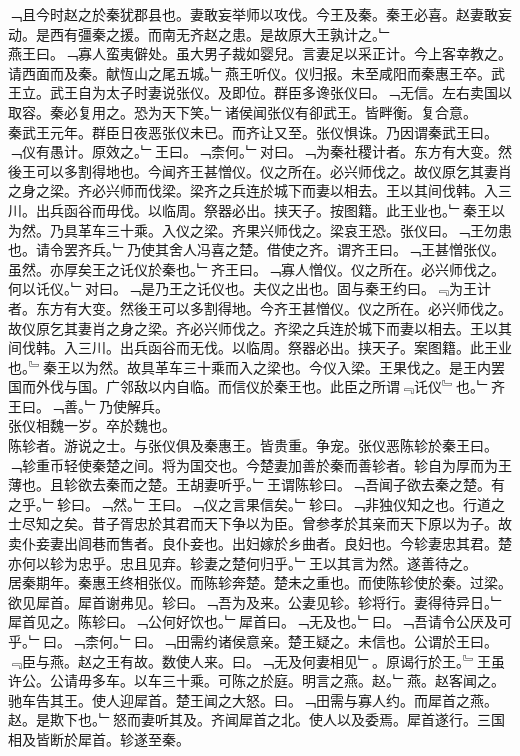 \documentclass{zhvt-classic}
\begin{document}
\hspace*{2em}﹁且今时赵之於秦犹郡县也。妻敢妄举师以攻伐。今王及秦。秦王必喜。赵妻敢妄动。是西有彊秦之援。而南无齐赵之患。是故原大王孰计之。﹂\\
\hspace*{2em}燕王曰。﹁寡人蛮夷僻处。虽大男子裁如婴兒。言妻足以采正计。今上客幸教之。请西面而及秦。献恆山之尾五城。﹂燕王听仪。仪归报。未至咸阳而秦惠王卒。武王立。武王自为太子时妻说张仪。及即位。群臣多谗张仪曰。﹁无信。左右卖国以取容。秦必复用之。恐为天下笑。﹂诸侯闻张仪有卻武王。皆畔衡。复合意。\\
\hspace*{2em}秦武王元年。群臣日夜恶张仪未已。而齐让又至。张仪惧诛。乃因谓秦武王曰。﹁仪有愚计。原效之。﹂王曰。﹁柰何。﹂对曰。﹁为秦社稷计者。东方有大变。然後王可以多割得地也。今闻齐王甚憎仪。仪之所在。必兴师伐之。故仪原乞其妻肖之身之梁。齐必兴师而伐梁。梁齐之兵连於城下而妻以相去。王以其间伐韩。入三川。出兵函谷而毋伐。以临周。祭器必出。挟天子。按图籍。此王业也。﹂秦王以为然。乃具革车三十乘。入仪之梁。齐果兴师伐之。梁哀王恐。张仪曰。﹁王勿患也。请令罢齐兵。﹂乃使其舍人冯喜之楚。借使之齐。谓齐王曰。﹁王甚憎张仪。虽然。亦厚矣王之讬仪於秦也。﹂齐王曰。﹁寡人憎仪。仪之所在。必兴师伐之。何以讬仪。﹂对曰。﹁是乃王之讬仪也。夫仪之出也。固与秦王约曰。﹃为王计者。东方有大变。然後王可以多割得地。今齐王甚憎仪。仪之所在。必兴师伐之。故仪原乞其妻肖之身之梁。齐必兴师伐之。齐梁之兵连於城下而妻以相去。王以其间伐韩。入三川。出兵函谷而无伐。以临周。祭器必出。挟天子。案图籍。此王业也。﹄秦王以为然。故具革车三十乘而入之梁也。今仪入梁。王果伐之。是王内罢国而外伐与国。广邻敌以内自临。而信仪於秦王也。此臣之所谓﹃讬仪﹄也。﹂齐王曰。﹁善。﹂乃使解兵。\\
\hspace*{2em}张仪相魏一岁。卒於魏也。\\
\hspace*{2em}陈轸者。游说之士。与张仪俱及秦惠王。皆贵重。争宠。张仪恶陈轸於秦王曰。﹁轸重币轻使秦楚之间。将为国交也。今楚妻加善於秦而善轸者。轸自为厚而为王薄也。且轸欲去秦而之楚。王胡妻听乎。﹂王谓陈轸曰。﹁吾闻子欲去秦之楚。有之乎。﹂轸曰。﹁然。﹂王曰。﹁仪之言果信矣。﹂轸曰。﹁非独仪知之也。行道之士尽知之矣。昔子胥忠於其君而天下争以为臣。曾参孝於其亲而天下原以为子。故卖仆妾妻出闾巷而售者。良仆妾也。出妇嫁於乡曲者。良妇也。今轸妻忠其君。楚亦何以轸为忠乎。忠且见弃。轸妻之楚何归乎。﹂王以其言为然。遂善待之。\\
\hspace*{2em}居秦期年。秦惠王终相张仪。而陈轸奔楚。楚未之重也。而使陈轸使於秦。过梁。欲见犀首。犀首谢弗见。轸曰。﹁吾为及来。公妻见轸。轸将行。妻得待异日。﹂犀首见之。陈轸曰。﹁公何好饮也。﹂犀首曰。﹁无及也。﹂曰。﹁吾请令公厌及可乎。﹂曰。﹁柰何。﹂曰。﹁田需约诸侯意亲。楚王疑之。未信也。公谓於王曰。﹃臣与燕。赵之王有故。数使人来。曰。﹁无及何妻相见﹂。原谒行於王。﹄王虽许公。公请毋多车。以车三十乘。可陈之於庭。明言之燕。赵。﹂燕。赵客闻之。驰车告其王。使人迎犀首。楚王闻之大怒。曰。﹁田需与寡人约。而犀首之燕。赵。是欺下也。﹂怒而妻听其及。齐闻犀首之北。使人以及委焉。犀首遂行。三国相及皆断於犀首。轸遂至秦。\\
\end{document}
